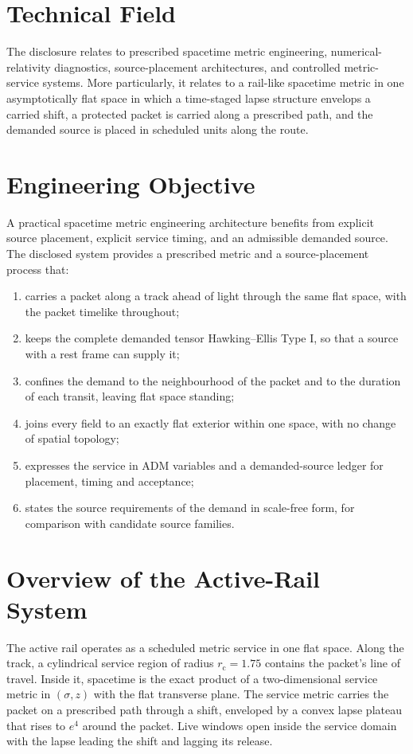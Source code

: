 \documentclass[11pt]{article}
\newcommand{\sig}{\sigma}
\newcommand{\rc}{r_{\mathrm c}}
\begin{document}
\section{Technical Field}

The disclosure relates to prescribed spacetime metric engineering, numerical-relativity diagnostics, source-placement architectures, and controlled metric-service systems. More particularly, it relates to a rail-like spacetime metric in one asymptotically flat space in which a time-staged lapse structure envelops a carried shift, a protected packet is carried along a prescribed path, and the demanded source is placed in scheduled units along the route.

\section{Engineering Objective}

A practical spacetime metric engineering architecture benefits from explicit source placement, explicit service timing, and an admissible demanded source. The disclosed system provides a prescribed metric and a source-placement process that:
\begin{enumerate}
\item carries a packet along a track ahead of light through the same flat space, with the packet timelike throughout;
\item keeps the complete demanded tensor Hawking--Ellis Type I, so that a source with a rest frame can supply it;
\item confines the demand to the neighbourhood of the packet and to the duration of each transit, leaving flat space standing;
\item joins every field to an exactly flat exterior within one space, with no change of spatial topology;
\item expresses the service in ADM variables and a demanded-source ledger for placement, timing and acceptance;
\item states the source requirements of the demand in scale-free form, for comparison with candidate source families.
\end{enumerate}

\section{Overview of the Active-Rail System}

The active rail operates as a scheduled metric service in one flat space. Along the track, a cylindrical service region of radius $\rc=1.75$ contains the packet's line of travel. Inside it, spacetime is the exact product of a two-dimensional service metric in $(\sig,z)$ with the flat transverse plane. The service metric carries the packet on a prescribed path through a shift, enveloped by a convex lapse plateau that rises to $e^{4}$ around the packet. Live windows open inside the service domain with the lapse leading the shift and lagging its release.
\end{document}
